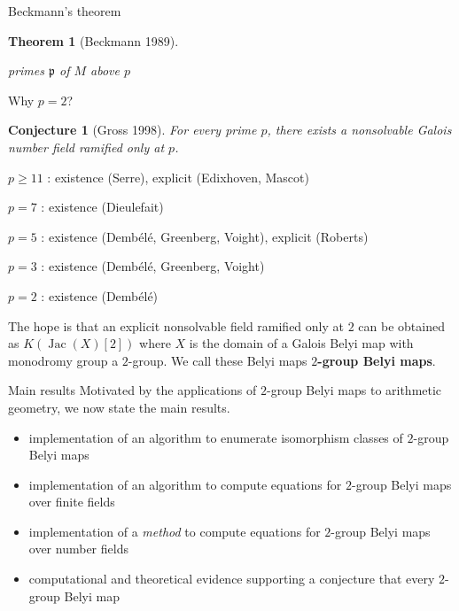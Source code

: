\documentclass[xcolor=dvipsnames]{beamer}
\theoremstyle{plain}
\newtheorem*{thm}{Theorem}
\newtheorem*{conj}{Conjecture}
\DeclareMathOperator{\Jac}{Jac}
\begin{document}
{\begin{frame}{Beckmann's theorem}
\begin{thm}[Beckmann 1989]
\begin{itemize}
            primes $\mathfrak{p}$ of $M$
            above $p$
        \end{itemize}
      \end{thm}
    \end{frame}
    \begin{frame}{Why $p=2$?}
      \begin{conj}[Gross 1998]
        \vspace{1pt}
        For every prime $p$,
        there exists a nonsolvable Galois number field
        ramified only at $p$.
      \end{conj}
      \pause
      $p\geq 11$ : existence (Serre), explicit (Edixhoven, Mascot)
      \par
      $p=7$ : existence (Dieulefait)
      \par
      $p=5$ : existence (Demb\'{e}l\'{e}, Greenberg, Voight), explicit (Roberts)
      \par
      $p=3$ : existence (Demb\'{e}l\'{e}, Greenberg, Voight)
      \par
      $p=2$ : existence (Demb\'{e}l\'{e})
      \pause
      \par
      The hope is that an explicit nonsolvable field ramified only at $2$
      can be obtained as $K(\Jac(X)[2])$ where
      $X$ is the domain of a Galois Belyi map
      with monodromy group a $2$-group.
      \pause\newline
      We call these Belyi maps
      \textbf{$2$-group Belyi maps}.
    \end{frame}
    \begin{frame}{Main results}
      Motivated by the applications of
      $2$-group Belyi maps to arithmetic geometry,
      we now state the main results.
      \pause
      \begin{itemize}
        \item
          implementation of an algorithm to
          enumerate isomorphism classes
          of $2$-group Belyi maps
          \pause
        \item
          implementation of an algorithm to
          compute equations for
          $2$-group Belyi maps
          over finite fields
          \pause
        \item
          implementation of a \emph{method}
          to compute equations for
          $2$-group Belyi maps
          over number fields
          \pause
        \item
          computational and theoretical evidence
          supporting a conjecture that
          every $2$-group Belyi map

\end{itemize}
\end{frame}}
\end{document}
